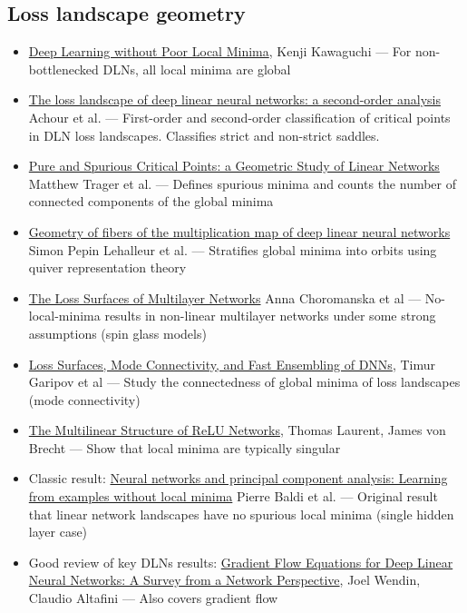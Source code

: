 \documentclass[11pt]{article}
\begin{document}
\subsection*{Loss landscape geometry}
\begin{itemize}
  \item \href{https://arxiv.org/abs/1605.07110}{Deep Learning without Poor Local Minima}, Kenji Kawaguchi --- For non-bottlenecked DLNs, all local minima are global
  \item \href{https://arxiv.org/abs/2107.13289}{The loss landscape of deep linear neural networks: a second-order analysis} Achour et al. --- First-order and second-order classification of critical points in DLN loss landscapes. Classifies strict and non-strict saddles.
  \item \href{https://arxiv.org/abs/1910.01671}{Pure and Spurious Critical Points: a Geometric Study of Linear Networks} Matthew Trager et al. --- Defines spurious minima and counts the number of connected components of the global minima
  \item \href{https://arxiv.org/abs/2411.19920}{Geometry of fibers of the multiplication map of deep linear neural networks} Simon Pepin Lehalleur et al. --- Stratifies global minima into orbits using quiver representation theory
  \item \href{https://arxiv.org/abs/1412.0233}{The Loss Surfaces of Multilayer Networks} Anna Choromanska et al --- No-local-minima results in non-linear multilayer networks under some strong assumptions (spin glass models)
  \item \href{https://arxiv.org/abs/1802.10026}{Loss Surfaces, Mode Connectivity, and Fast Ensembling of DNNs}, Timur Garipov et al --- Study the connectedness of global minima of loss landscapes (mode connectivity)
  \item \href{https://arxiv.org/abs/1712.10132}{The Multilinear Structure of ReLU Networks}, Thomas Laurent, James von Brecht --- Show that local minima are typically singular
  \item Classic result: \href{https://www.sciencedirect.com/science/article/abs/pii/0893608089900142}{Neural networks and principal component analysis: Learning from examples without local minima} Pierre Baldi et al. --- Original result that linear network landscapes have no spurious local minima (single hidden layer case)
  \item Good review of key DLNs results: \href{https://arxiv.org/abs/2511.10362}{Gradient Flow Equations for Deep Linear Neural Networks: A Survey from a Network Perspective}, Joel Wendin, Claudio Altafini --- Also covers gradient flow
\end{itemize}
\end{document}
